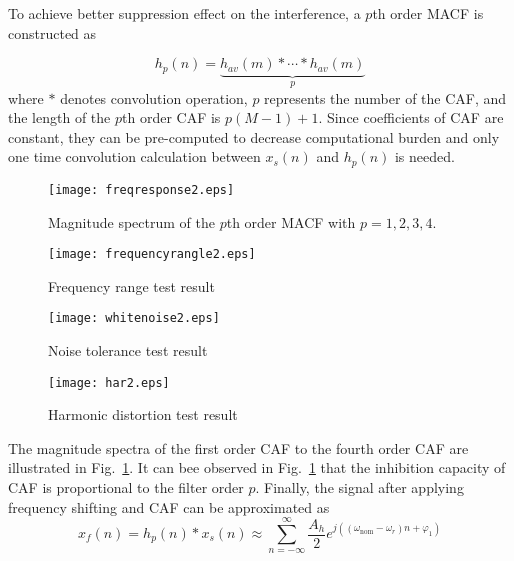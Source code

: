 \documentclass[journal,twoside]{IEEEtran}
\begin{document}
To achieve better suppression effect on the interference, a $p$th order MACF is constructed as

\begin{equation}
h_p(n)=\underbrace{h_{av}(m)*\cdots*h_{av}(m)}_{p}\label{eqn_9}
\end{equation}
where $*$ denotes convolution operation, $p$ represents the number of the CAF, and the length of the $p$th order CAF is $p(M-1)+1$. Since coefficients of CAF are constant, they can be pre-computed to decrease computational burden and only one time convolution calculation between $x_s(n)$ and $h_p(n)$ is needed. 
\begin{figure}[t]
	\centering
	\texttt{[image: freqresponse2.eps]}
		
	\caption{Magnitude spectrum of the $p$th order MACF with $p=1,2,3,4$.}
	\label{fig_1}											
\end{figure}


\begin{figure}[t]
	\centering
	\texttt{[image: frequencyrangle2.eps]}
	
	\caption{Frequency range test result}
	\label{fig_2}											
\end{figure}

\begin{figure}[t]
	\centering
	\texttt{[image: whitenoise2.eps]}
	
	\caption{Noise tolerance test result}
	\label{fig_3}											
\end{figure}

\begin{figure}[t]
	\centering
	\texttt{[image: har2.eps]}
		
	\caption{Harmonic distortion test result }
	\label{fig_4}									
\end{figure}




The magnitude spectra of the first order CAF to the fourth order CAF are illustrated in Fig.~\ref{fig_1}. It can bee observed in Fig.~\ref{fig_1} that the inhibition capacity of CAF is proportional to the filter order $p$.
Finally, the signal after applying frequency shifting and CAF  can be approximated  as
\begin{equation}
x_f(n)=h_p(n)*x_s(n)\approx\sum_{n=-\infty}^{\infty}\dfrac{A_h}{2}e^{j\left((\omega_\mathrm{nom}-\omega_r)n+\varphi_1\right)}\label{eqn_10}
\end{equation}
\end{document}
